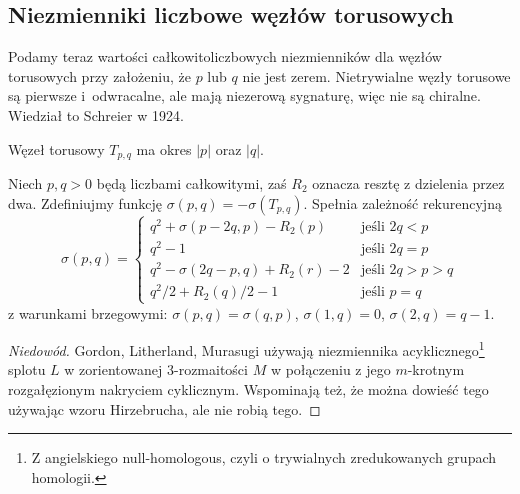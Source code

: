 \subsection{Niezmienniki liczbowe węzłów torusowych}
Podamy teraz wartości całkowitoliczbowych niezmienników dla węzłów torusowych przy założeniu, że $p$ lub $q$ nie jest zerem.
Nietrywialne węzły torusowe są pierwsze i~odwracalne, ale mają niezerową sygnaturę, więc nie są chiralne.
Wiedział to Schreier w 1924.

\begin{proposition}
%
    Węzeł torusowy $T_{p, q}$ ma okres $|p|$ oraz $|q|$.
\end{proposition}

\begin{proposition}
%
    Niech $p, q > 0$ będą liczbami całkowitymi, zaś $R_2$ oznacza resztę z dzielenia przez dwa.
    Zdefiniujmy funkcję $\sigma(p, q) = - \sigma(T_{p, q})$.
    Spełnia zależność rekurencyjną
    \begin{equation}
        \sigma(p, q) = \begin{cases}
             q^2 + \sigma(p-2q, p) - R_2(p)       & \text{jeśli } 2q < p \\
             q^2 - 1                              & \text{jeśli } 2q = p \\
             q^2 - \sigma(2q - p, q) + R_2(r) - 2 & \text{jeśli } 2q > p > q \\
             q^2/2 + R_2(q)/2 - 1                 & \text{jeśli } p = q
        \end{cases}
    \end{equation}
    z warunkami brzegowymi: $\sigma(p, q) = \sigma(q, p)$, $\sigma(1, q) = 0$, $\sigma(2, q) = q-1$.
\end{proposition}

\begin{proof}[Niedowód]
%
%
%
    Gordon, Litherland, Murasugi \cite[tw. 5.2]{litherland81} używają niezmiennika acyklicznego\footnote{Z angielskiego null-homologous, czyli o trywialnych zredukowanych grupach homologii.} splotu $L$ w zorientowanej 3-rozmaitości $M$ w połączeniu z jego $m$-krotnym rozgałęzionym nakryciem cyklicznym.
    Wspominają też, że można dowieść tego używając wzoru Hirzebrucha, ale nie robią tego.
\end{proof}

